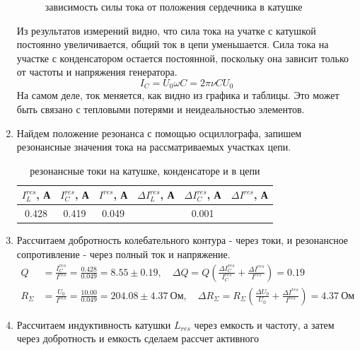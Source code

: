 \documentclass[a4paper, 12pt]{article}
\begin{document}
\begin{enumerate}
\begin{figure}[htbp]
        \label{зависимость сил тока для разных расстояний}
        \caption{зависимость силы тока от положения сердечника в катушке}
    \end{figure}\newline
    Из результатов измерений видно, что сила тока на учатке с катушкой постоянно увеличивается, общий ток в цепи уменьшается. Сила тока 
    на участке с конденсатором остается постоянной, поскольку она зависит только от частоты и напряжения генератора.
    \begin{equation}
        I_{C} = U_{0} \omega C = 2\pi \nu C U_{0}
        \label{ток на участке с конденсатором}
    \end{equation}
    На самом деле, ток меняется, как видно из графика и таблицы. Это может быть связано с тепловыми потерями и неидеальностью элементов.
    \item Найдем положение резонанса с помощью осциллографа, запишем резонансные значения тока на рассматриваемых участках цепи.
    \begin{table}[htbp]
        \centering
        \begin{tabular}{|c|c|c|c|c|c|}
            \hline
            $I^{res}_{L}$, А & $I^{res}_{C}$, А & $I^{res}$, А & $\Delta I^{res}_{L}$, А & $\Delta I^{res}_{C}$, А & $\Delta I^{res}$, А\\
            \hline
            0.428 & 0.419 & 0.049 & \multicolumn{3}{|c|}{0.001}\\
            \hline
        \end{tabular}
        \caption{резонансные токи на катушке, конденсаторе и в цепи}
        \label{резонансные токи на катушке, конденсаторе и в цепи}
    \end{table}
    \item Рассчитаем добротность колебательного контура - через токи, и резонансное сопротивление - через полный ток и напряжение.
    \begin{align}
        Q &= \frac{I^{res}_{C}}{I^{res}} = \frac{0.428}{0.049} = 8.55 \pm 0.19, \quad \Delta Q = Q\left(\frac{\Delta I^{res}_{C}}{I^{res}_{C}} + \frac{\Delta I^{res}}{I^{res}}\right) = 0.19\\
        R_{\Sigma} &= \frac{U_{0}}{I^{res}} = \frac{10.00}{0.049} = 204.08 \pm 4.37\ \text{Ом}, \quad \Delta R_{\Sigma} = R_{\Sigma}\left(\frac{\Delta U_{0}}{U_{0}} + \frac{\Delta I^{res}}{I^{res}}\right) = 4.37\ \text{Ом}
    \end{align}
    \item Рассчитаем индуктивность катушки $L_{res}$ через емкость и частоту, а затем через добротность и емкость сделаем рассчет активного

\end{enumerate}
\end{document}
